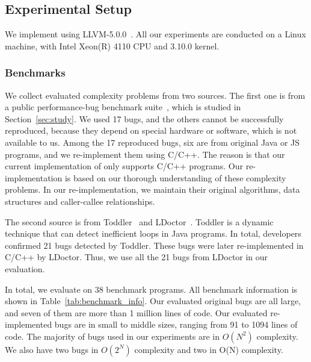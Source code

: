 \subsection{Experimental Setup}

We implement \Tool using LLVM-5.0.0~\cite{llvm}. 
All our experiments are conducted on a Linux machine, 
with Intel Xeon(R) 4110 CPU and 3.10.0 kernel.





\subsubsection{Benchmarks}

We collect evaluated complexity problems from two sources. 
The first one is
from a public performance-bug benchmark 
suite~\cite{PerfBug,SongOOPSLA2014,ldoctor}, which is
studied in Section~\ref{sec:study}.
We used 17 bugs, and the others cannot be successfully
reproduced, because they depend on special hardware 
or software, which is not available to us. 
Among the 17 reproduced bugs, six are from
original Java or JS programs, 
and we re-implement them using C/C++.
The reason is that our current implementation of \Tool 
only supports C/C++ programs.
Our re-implementation is based on our thorough 
understanding of these complexity problems.
In our re-implementation, we maintain 
their original algorithms, 
data structures and caller-callee relationships. 


The second source is from Toddler~\cite{Alabama} and LDoctor~\cite{ldoctor}. 
Toddler is a dynamic technique that can detect inefficient loops in Java programs.
In total, developers confirmed 21 bugs detected by Toddler. 
These bugs were later re-implemented in C/C++ by LDoctor. 
Thus, we use all the 21 bugs from LDoctor in our evaluation.  


In total, we evaluate \Tool on 38 benchmark programs. 
All benchmark information is shown in Table~\ref{tab:benchmark_info}. 
Our evaluated original bugs are all large, and seven of them 
are more than 1 million lines of code.
Our evaluated re-implemented bugs are in small to middle sizes, 
ranging from 91 to 1094 lines of code. 
The majority of bugs used in our experiments are in $O(N^2)$ complexity. 
We also have two bugs in $O(2^N)$ complexity 
and two in O(N) complexity.


